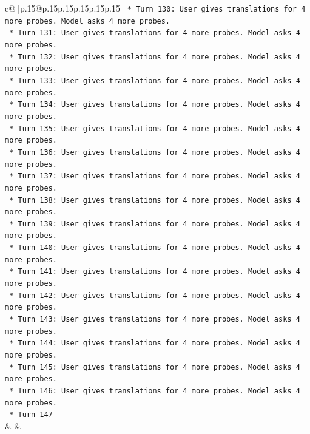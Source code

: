 \documentclass{article}
\begin{document}
{\begin{supertabular}{c@{$\;$}|p{.15\linewidth}@{}p{.15\linewidth}p{.15\linewidth}p{.15\linewidth}p{.15\linewidth}p{.15\linewidth}}
{{{\texttt{                    *   Turn 130: User gives translations for 4 more probes. Model asks 4 more probes.} \\
\texttt{                    *   Turn 131: User gives translations for 4 more probes. Model asks 4 more probes.} \\
\texttt{                    *   Turn 132: User gives translations for 4 more probes. Model asks 4 more probes.} \\
\texttt{                    *   Turn 133: User gives translations for 4 more probes. Model asks 4 more probes.} \\
\texttt{                    *   Turn 134: User gives translations for 4 more probes. Model asks 4 more probes.} \\
\texttt{                    *   Turn 135: User gives translations for 4 more probes. Model asks 4 more probes.} \\
\texttt{                    *   Turn 136: User gives translations for 4 more probes. Model asks 4 more probes.} \\
\texttt{                    *   Turn 137: User gives translations for 4 more probes. Model asks 4 more probes.} \\
\texttt{                    *   Turn 138: User gives translations for 4 more probes. Model asks 4 more probes.} \\
\texttt{                    *   Turn 139: User gives translations for 4 more probes. Model asks 4 more probes.} \\
\texttt{                    *   Turn 140: User gives translations for 4 more probes. Model asks 4 more probes.} \\
\texttt{                    *   Turn 141: User gives translations for 4 more probes. Model asks 4 more probes.} \\
\texttt{                    *   Turn 142: User gives translations for 4 more probes. Model asks 4 more probes.} \\
\texttt{                    *   Turn 143: User gives translations for 4 more probes. Model asks 4 more probes.} \\
\texttt{                    *   Turn 144: User gives translations for 4 more probes. Model asks 4 more probes.} \\
\texttt{                    *   Turn 145: User gives translations for 4 more probes. Model asks 4 more probes.} \\
\texttt{                    *   Turn 146: User gives translations for 4 more probes. Model asks 4 more probes.} \\
\texttt{                    *   Turn 147} \\
            }
        }
    }
    & & \\ \\


\end{supertabular}}
\end{document}
